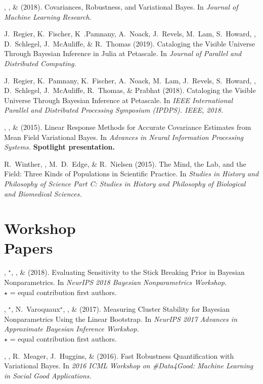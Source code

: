 \me, \tamara, \& \mike (2018).  Covariances, Robustness, and Variational Bayes.
In \emph{Journal of Machine Learning Research.}

J.~Regier, K.~Fischer, K~.Pamnany, A.~Noack, J.~Revels, M.~Lam, S.~Howard,
\me, D.~Schlegel, J.~McAuliffe, \& R.~Thomas (2019). Cataloging the Visible
Universe Through Bayesian Inference in Julia at Petascale. In \emph{Journal of
Parallel and Distributed Computing.}

J.~Regier, K.~Pamnany, K.~Fischer, A.~Noack, M.~Lam, J.~Revels, S.~Howard, \me,
D.~Schlegel, J.~McAuliffe, R.~Thomas, \& Prabhat (2018).  Cataloging the Visible
Universe Through Bayesian Inference at Petascale.  In \emph{IEEE International
Parallel and Distributed Processing Symposium (IPDPS). IEEE, 2018.}

\me, \tamara, \& \mike (2015). Linear Response Methods for Accurate Covariance
Estimates from Mean Field Variational Bayes. In \emph{Advances in Neural
Information Processing Systems.}
\textbf{Spotlight presentation.}

R.~Winther, \me, M.~D.~Edge, \& R.~Nielsen (2015).  The Mind, the Lab, and the
Field: Three Kinds of Populations in Scientific Practice.  In \emph{Studies in
History and Philosophy of Science Part C: Studies in History and Philosophy of
Biological and Biomedical Sciences.}


\section{\sc Workshop \\ Papers}

\mestar, \runjing{}$^\star$, \mike, \& \tamara (2018).
Evaluating Sensitivity to the Stick Breaking Prior in Bayesian Nonparametrics.
In \emph{NeurIPS 2018 Bayesian Nonparametrics Workshop.}\\
$\star$ = equal contribution first authors.

\mestar, \runjing{}$^\star$, N.~Varoquaux$^\star$, \mike, \& \tamara (2017).
Measuring Cluster Stability for Bayesian Nonparametrics Using the Linear Bootstrap.
In \emph{NeurIPS 2017 Advances in Approximate Bayesian Inference Workshop.}\\
$\star$ = equal contribution first authors.

\me, \tamara, R.~Meager, J.~Huggins, \& \mike (2016). Fast Robustness
Quantification with Variational Bayes. In \emph{2016 ICML Workshop on
\#Data4Good: Machine Learning in Social Good Applications.}

